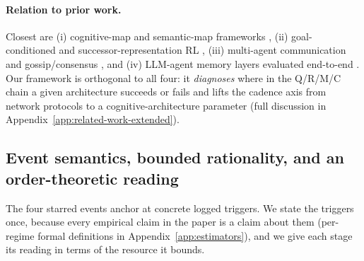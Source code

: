 \documentclass{article}
\begin{document}
\paragraph{Relation to prior work.} Closest are (i) cognitive-map and semantic-map frameworks \citep{tolman1948cognitive,okeefe1978hippocampus,kuipers2000spatial,gupta2017cognitive,savinov2018semi}, (ii) goal-conditioned and successor-representation RL \citep{andrychowicz2017hindsight,ghosh2021learning,dayan1993improving,stachenfeld2017hippocampus,momennejad2017successor}, (iii) multi-agent communication \citep{lowe2017maddpg,foerster2018ctde,sukhbaatar2016commnet,foerster2016learning} and gossip/consensus \citep{boyd2006gossip,xiao2007distributed}, and (iv) LLM-agent memory layers evaluated end-to-end \citep{wang2023voyager,shinn2023reflexion,packer2023memgpt}. Our framework is orthogonal to all four: it \emph{diagnoses} where in the Q/R/M/C chain a given architecture succeeds or fails and lifts the cadence axis from network protocols to a cognitive-architecture parameter (full discussion in Appendix~\ref{app:related-work-extended}).

\subsection{Event semantics, bounded rationality, and an order-theoretic reading}
\label{sec:event-semantics}

The four starred events anchor at concrete logged triggers. We state the triggers once, because every empirical claim in the paper is a claim about them (per-regime formal definitions in Appendix~\ref{app:estimators}), and we give each stage its reading in terms of the resource it bounds.
\end{document}
